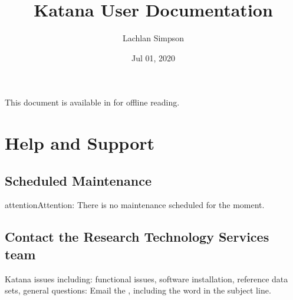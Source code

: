 \documentclass[letterpaper,10pt,english]{sphinxmanual}
\title{Katana User Documentation}
\date{Jul 01, 2020}
\author{Lachlan Simpson}
\begin{document}
\pagestyle{empty}
\sphinxmaketitle
\pagestyle{plain}
\sphinxtableofcontents
\pagestyle{normal}
\label{\detokenize{index::doc}}


This document is available in  for offline reading.


\chapter{Help and Support}
\label{\detokenize{help_and_support:help-and-support}}\label{\detokenize{help_and_support:id1}}\label{\detokenize{help_and_support::doc}}

\section{Scheduled Maintenance}
\label{\detokenize{help_and_support:scheduled-maintenance}}
\begin{sphinxadmonition}{attention}{Attention:}
There is no maintenance scheduled for the moment.
\end{sphinxadmonition}


\section{Contact the Research Technology Services team}
\label{\detokenize{help_and_support:contact-the-research-technology-services-team}}\label{\detokenize{help_and_support:contact-us}}
Katana issues including: functional issues, software installation, reference data sets, general questions:
Email the , including the word  in the subject line.
\end{document}

